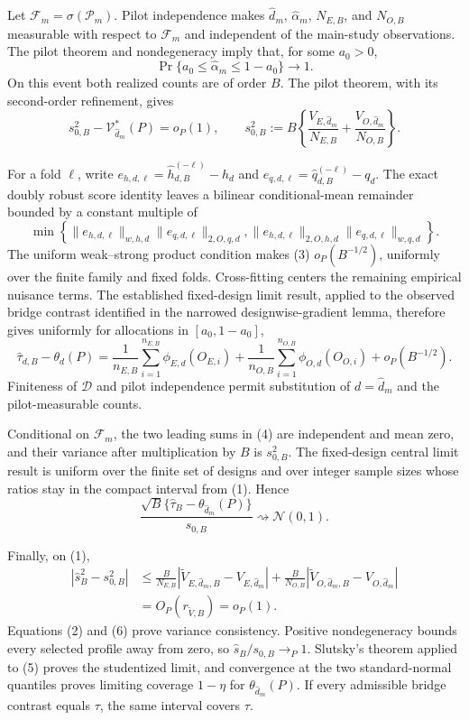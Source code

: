 Let \(\mathcal F_m=\sigma(\mathcal P_m)\).  Pilot independence makes \(\widehat d_m\), \(\widehat\alpha_m\), \(N_{E,B}\), and \(N_{O,B}\) measurable with respect to \(\mathcal F_m\) and independent of the main-study observations.  The pilot theorem and nondegeneracy imply that, for some \(a_0>0\),
\[
 \Pr\{a_0\le\widehat\alpha_m\le1-a_0\}\longrightarrow1. \tag{1}
\]
On this event both realized counts are of order \(B\).  The pilot theorem, with its second-order refinement, gives
\[
 s_{0,B}^2-\mathcal V_{\widehat d_m}^*(P)=o_P(1),\qquad
 s_{0,B}^2:=B\left\{\frac{V_{E,\widehat d_m}}{N_{E,B}}+
 \frac{V_{O,\widehat d_m}}{N_{O,B}}\right\}. \tag{2}
\]

For a fold \(\ell\), write \(e_{h,d,\ell}=\widehat h_{d,B}^{(-\ell)}-h_d\) and \(e_{q,d,\ell}=\widehat q_{d,B}^{(-\ell)}-q_d\).  The exact doubly robust score identity leaves a bilinear conditional-mean remainder bounded by a constant multiple of
\[
 \min\left\{
 \|e_{h,d,\ell}\|_{w,h,d}\|e_{q,d,\ell}\|_{2,O,q,d},
 \|e_{h,d,\ell}\|_{2,O,h,d}\|e_{q,d,\ell}\|_{w,q,d}
 \right\}. \tag{3}
\]
The uniform weak--strong product condition makes (3) \(o_P(B^{-1/2})\), uniformly over the finite family and fixed folds.  Cross-fitting centers the remaining empirical nuisance terms.  The established fixed-design limit result, applied to the observed bridge contrast identified in the narrowed designwise-gradient lemma, therefore gives uniformly for allocations in \([a_0,1-a_0]\),
\[
 \widehat\tau_{d,B}-\theta_d(P)
 =\frac1{n_{E,B}}\sum_{i=1}^{n_{E,B}}\phi_{E,d}(O_{E,i})
 +\frac1{n_{O,B}}\sum_{i=1}^{n_{O,B}}\phi_{O,d}(O_{O,i})
 +o_P(B^{-1/2}). \tag{4}
\]
Finiteness of \(\mathcal D\) and pilot independence permit substitution of \(d=\widehat d_m\) and the pilot-measurable counts.

Conditional on \(\mathcal F_m\), the two leading sums in (4) are independent and mean zero, and their variance after multiplication by \(B\) is \(s_{0,B}^2\).  The fixed-design central limit result is uniform over the finite set of designs and over integer sample sizes whose ratios stay in the compact interval from (1).  Hence
\[
 \frac{\sqrt B\{\widehat\tau_B-\theta_{\widehat d_m}(P)\}}
 {s_{0,B}}\rightsquigarrow\mathcal N(0,1). \tag{5}
\]

Finally, on (1),
\[
\begin{aligned}
 |\widehat s_B^2-s_{0,B}^2|
 &\le \frac B{N_{E,B}}|\widetilde V_{E,\widehat d_m,B}-V_{E,\widehat d_m}|
 +\frac B{N_{O,B}}|\widetilde V_{O,\widehat d_m,B}-V_{O,\widehat d_m}|\\
 &=O_P(r_{\widetilde V,B})=o_P(1).
\end{aligned}\tag{6}
\]
Equations (2) and (6) prove variance consistency.  Positive nondegeneracy bounds every selected profile away from zero, so \(\widehat s_B/s_{0,B}\to_P1\).  Slutsky's theorem applied to (5) proves the studentized limit, and convergence at the two standard-normal quantiles proves limiting coverage \(1-\eta\) for \(\theta_{\widehat d_m}(P)\).  If every admissible bridge contrast equals \(\tau\), the same interval covers \(\tau\).